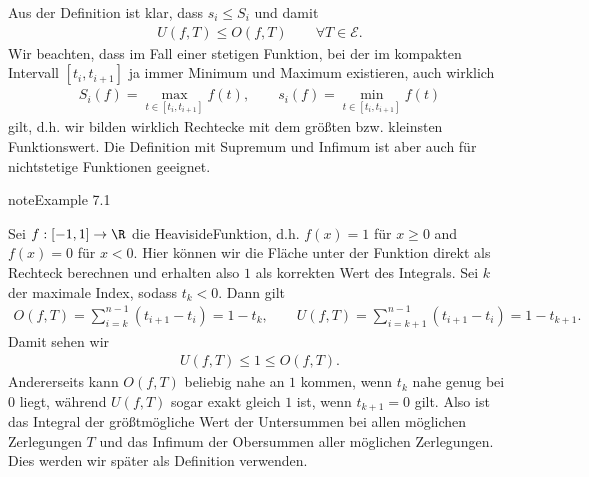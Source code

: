 \documentclass[letterpaper,10pt,english]{jupyterBook}
\begin{document}
Aus der Definition ist klar, dass \(s_i \leq S_i\) und damit
\begin{equation*}
\begin{split} U(f,T) \leq O(f,T) \qquad \forall T \in {\mathcal E}.\end{split}
\end{equation*}
Wir beachten, dass im Fall einer stetigen Funktion, bei der im kompakten Intervall \([t_i,t_{i+1}]\) ja immer Minimum und Maximum existieren, auch wirklich
\begin{equation*}
\begin{split} S_i(f) =  \max_{t \in  [t_i,t_{i+1}]} f(t), \qquad s_i(f) =  \min_{t \in  [t_i,t_{i+1}]} f(t)\end{split}
\end{equation*}
gilt, d.h. wir bilden wirklich Rechtecke mit dem größten bzw. kleinsten Funktionswert. Die Definition mit Supremum und Infimum ist aber auch für nichtstetige Funktionen geeignet.
\label{integration/integration:example-0}
\begin{sphinxadmonition}{note}{Example 7.1}



Sei \(f:[-1,1] \rightarrow \R\) die Heaviside\sphinxhyphen{}Funktion, d.h. \(f(x) =1 \) für \(x \geq 0\) and \(f(x) = 0\) für \(x < 0\). Hier können wir die Fläche unter der Funktion direkt als Rechteck berechnen und erhalten also \(1\) als korrekten Wert des Integrals.
Sei \(k\) der maximale Index, sodass \(t_k < 0\). Dann gilt
\begin{equation*}
\begin{split}  O(f,T) = \sum_{i=k}^{n-1} (t_{i+1} - t_i) = 1 - t_k, \qquad U(f,T) = \sum_{i=k+1}^{n-1} (t_{i+1} - t_i) = 1 - t_{k+1}. \end{split}
\end{equation*}
Damit sehen wir
\begin{equation*}
\begin{split} U(f,T) \leq 1 \leq O(f,T).\end{split}
\end{equation*}
Andererseits kann \(O(f,T)\) beliebig nahe an \(1\) kommen, wenn \(t_k\) nahe genug bei \(0\) liegt, während \(U(f,T)\) sogar exakt gleich \(1\) ist, wenn \(t_{k+1} = 0\) gilt. Also ist das Integral der größtmögliche Wert der Untersummen bei allen möglichen Zerlegungen \(T\) und das Infimum der Obersummen aller möglichen Zerlegungen. Dies werden wir später als Definition verwenden.
\end{sphinxadmonition}
\label{integration/integration:lemma-1}
\end{document}
